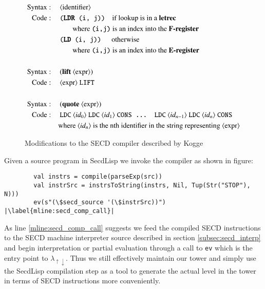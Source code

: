 \documentclass[a4paper,12pt,twoside,openright]{report}
\theoremstyle{definition}
\newcommand{\mslang}{$\lambda_{\uparrow\downarrow}$}
\newcommand{\secdlisp}{SecdLisp}
\begin{document}
\begin{figure}[ht!]
\centering
\begin{alignat}{5}
		\text{Syntax}   & : && \: \text{$\langle$identifier$\rangle$} \\
		\text{Code}     & : && \: \texttt{(\textbf{LDR} (i, j))} \quad \text{if lookup is in a \textbf{letrec}} \nonumber \\
		& && \qquad\text{where \texttt{(i,j)} is an index into the \textbf{F-register}} \nonumber \\
		& && \: \texttt{(\textbf{LD} (i, j))} \quad\:\: \text{otherwise} \nonumber \\
		& && \qquad\text{where \texttt{(i,j)} is an index into the \textbf{E-register}} \nonumber \\
		\nonumber \\%
		\text{Syntax}   & : && \: \text{(\textbf{lift} $\langle$expr$\rangle$)} \\
		\text{Code}     & : && \: \text{$\langle$expr$\rangle$ \texttt{LIFT}} \nonumber \\
		\nonumber \\%
		\text{Syntax}   & : && \: \text{(\textbf{quote} $\langle$expr$\rangle$)} \label{eq:secd_comp_sem_quote} \\
		\text{Code}     & : && \: \text{\texttt{LDC} $\langle id_{0} \rangle$ \texttt{LDC} $\langle id_{1} \rangle$ \texttt{CONS ... LDC} $\langle id_{n-1} \rangle$ \texttt{LDC} $\langle id_{n} \rangle$ \texttt{CONS}} \nonumber \\
		& && \text{where $\langle id_{n} \rangle$ is the nth identifier in the string representing $\langle$expr$\rangle$} \nonumber
\end{alignat}
\caption{Modifications to the SECD compiler described by Kogge \cite{kogge1990architecture}}
\label{fig:secd_comp_semantics}
\end{figure}
\newpage

Given a source program in \secdlisp{} we invoke the compiler as shown in figure:
\begin{verbatim}
        val instrs = compile(parseExp(src))
        val instrSrc = instrsToString(instrs, Nil, Tup(Str("STOP"), N)))
        ev(s"(\$secd_source '(\$instrSrc))") |\label{mline:secd_comp_call}|
\end{verbatim}

As line \ref{mline:secd_comp_call} suggests we feed the compiled SECD instructions to the SECD machine interpreter source described in section \ref{subsec:secd_interp} and begin interpretation or partial evaluation through a call to \texttt{ev} which is the entry point to \mslang. Thus we still effectively maintain our tower and simply use the \secdlisp{} compilation step as a tool to generate the actual level in the tower in terms of SECD instructions more conveniently.
\end{document}
